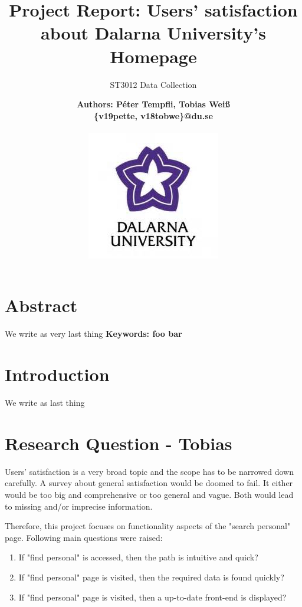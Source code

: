 \documentclass[12pt,a4paper,paper=a4,oneside,titlepage,pdftex]{scrartcl}
\begin{document}
	

\title{Project Report: Users' satisfaction about Dalarna University's Homepage}
\subtitle{ST3012 Data Collection}
\author{
	\bfseries\Large Authors: Péter Tempfli, Tobias Weiß\\
	\{v19pette, v18tobwe\}@du.se
	\\ \\
	\includegraphics[]{figures/du-logo.jpg}\\
}

\maketitle
\tableofcontents
\newpage

\section{Abstract}
We write as very last thing
\vspace{10px}
\textbf{Keywords: foo bar}

\section{Introduction}
We write as last thing

\section{Research Question - Tobias}
Users' satisfaction is a very broad topic and the scope has to be narrowed down carefully. A survey about general satisfaction would be doomed to fail. It either would be too big and comprehensive or too general and vague. Both would lead to missing and/or imprecise information.

Therefore, this project focuses on functionality aspects of the "search personal" page. Following main questions were raised:
\begin{enumerate}
	\item If "find personal" is accessed, then the path is intuitive and quick?
	\item If "find personal" page is visited, then the required data is found quickly?
	\item If "find personal" page is visited, then a up-to-date front-end is displayed?
\end{enumerate}
\end{document}
